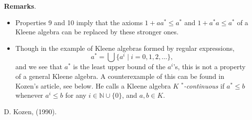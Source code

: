 \documentclass[12pt]{article}
\begin{document}
\textbf{Remarks}.  
\begin{itemize}
\item
Properties 9 and 10 imply that the axioms $1+aa^*\le a^*$ and $1+a^*a\le a^*$ of a Kleene algebra can be replaced by these stronger ones.
\item
Though in the example of Kleene algebras formed by regular expressions, $$a^*=\bigcup \lbrace a^i\mid i=0,1,2,\ldots \rbrace,$$ and we see that $a^*$ is the least upper bound of the $a^i$'s, this is not a property of a general Kleene algebra.  A counterexample of this can be found in Kozen's article, see below.  He calls a Kleene algebra $K$ \emph{$^*$-continuous} if $a^*\le b$ whenever $a^i\le b$ for any $i\in \mathbb{N}\cup\lbrace0\rbrace$, and $a,b\in K$.
\end{itemize}

\begin{thebibliography}{8}
 D. Kozen, {\em {}} (1990).
\end{thebibliography}


\end{document}
